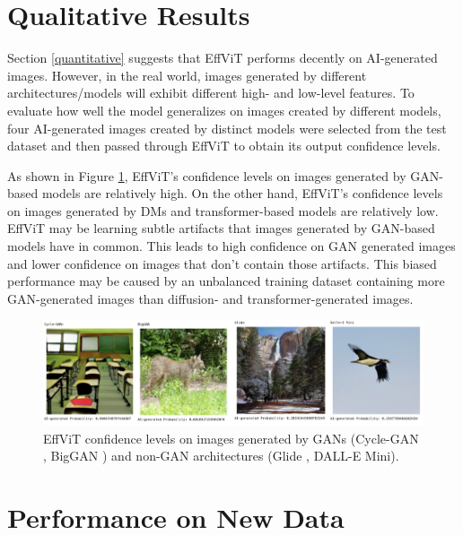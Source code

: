 \documentclass{article} %
\begin{document}
\section{Qualitative Results}

Section \ref{quantitative} suggests that EffViT performs decently on AI-generated images. However, in the real world, images generated by different architectures/models will exhibit different high- and low-level features. To evaluate how well the model generalizes on images created by different models, four AI-generated images created by distinct models were selected from the test dataset and then passed through EffViT to obtain its output confidence levels.

As shown in Figure \ref{fig:Conf}, EffViT's confidence levels on images generated by GAN-based models are relatively high. On the other hand, EffViT's confidence levels on images generated by DMs and transformer-based models are relatively low. EffViT may be learning subtle artifacts that images generated by GAN-based models have in common. This leads to high confidence on GAN generated images and lower confidence on images that don't contain those artifacts. This biased performance may be caused by an unbalanced training dataset containing more GAN-generated images than diffusion- and transformer-generated images.

\begin{figure}[h]
    \begin{center}
        \includegraphics[scale=0.45]{figs/Confidence shrinked.png}
    \end{center}
    \caption{EffViT confidence levels on images generated by GANs (Cycle-GAN \citep{zhu2020unpairedimagetoimagetranslationusing}, BigGAN \citep{brock2019largescalegantraining}) and non-GAN architectures (Glide \citep{nichol2022glidephotorealisticimagegeneration}, DALL-E Mini).}
    \label{fig:Conf}
\end{figure}


\section{Performance on New Data}
\end{document}
